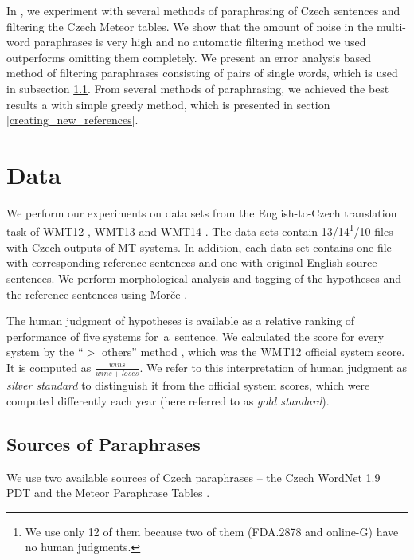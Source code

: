 In \cite{barancikova:2014}, we experiment with several methods of paraphrasing of Czech sentences and
filtering the Czech Meteor tables. We show that the amount of noise in the multi-word paraphrases is very high
and no automatic filtering method we used outperforms omitting them completely. We present an error analysis 
based method of filtering paraphrases consisting of pairs of single words, which is used in subsection 
\ref{zdroje_parafrazi}. From several methods of paraphrasing, we achieved the best results a with simple greedy 
method, which is presented in section \ref{creating_new_references}.

\section{Data}
We perform our experiments on data sets from the English-to-Czech translation task 
of WMT12 \cite{wmt12}, WMT13 \cite{wmt13} and WMT14 \cite{wmt14}. The 
data sets contain 13/14\footnote{We use only 12 of them because two of them (FDA.2878 
and online-G) have no human judgments.}/10 files with Czech outputs of MT systems.
In addition, each data set contains one file with corresponding reference sentences and one with original 
English source sentences. We perform morphological analysis and tagging 
of the hypotheses and the reference sentences using Morče \cite{morce:2007}.

The human judgment of hypotheses is available as a relative ranking of performance of 
five systems for~a~sentence. We calculated the score for every system by the “$ > $ others” 
method \cite{bojar-grains}, which was the WMT12 official system score. It is computed 
as $ \frac{wins}{wins+loses} $. We refer to this interpretation of human judgment as 
\textit{silver standard} to distinguish it from the official system scores, which were 
computed differently each year (here referred to as \textit{gold standard}).

\subsection{Sources of Paraphrases}
\label{zdroje_parafrazi}
We use two available sources of Czech paraphrases -- the Czech WordNet 1.9 PDT 
\cite{czech-wordnet} and the Meteor Paraphrase Tables \cite{meteor-tables}. 

\begin{table}[tb]
\begin{center}
\caption{Average number of one-word paraphrases per sentence found in WordNet, 
filtered Meteor tables and their union over all systems.}
\label{number_of_substitutions}
\end{center}
\end{table}

